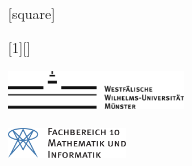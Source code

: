 [square]

\title{\shorttitel}
\author{\verfasser}

[1][]
{
	\begin{center}
	\begin{minipage}{0.4\textwidth}
	\begin{flushleft}
	\hspace*{1em}\includegraphics[height=1cm,keepaspectratio]{../img/wwulogo.pdf}
	\end{flushleft}
	\end{minipage}
	\hfill
	\begin{minipage}{0.4\textwidth}
	\begin{flushright}
	\vspace*{0.3cm}
	\includegraphics[height=0.8cm,keepaspectratio]{../img/fb10logo.pdf} \hspace*{1em}
	\end{flushright}
	\end{minipage}
  
	\vfill
   
	\textcolor{structure}{{\LARGE \titel}}\par
	\vspace*{0.3cm}
	\subtitel\par
	\vspace*{1cm}
	\verfasser \par
	{\tt {\footnotesize \authormail}}\par
	\vspace*{0.3cm}
	{\footnotesize \datum}\par
  \end{center}
}

